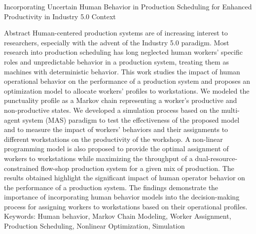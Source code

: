 Incorporating Uncertain Human Behavior in Production
Scheduling for Enhanced Productivity in Industry 5.0 Context
 
Abstract
Human-centered production systems are of increasing interest to researchers, especially with the advent of the Industry 5.0 paradigm. Most research into production scheduling has long neglected human workers’ specific roles and unpredictable behavior in a production system, treating them as machines with deterministic behavior. This work studies the impact of human operational behavior on the performance of a production system and proposes an optimization model to allocate workers’ profiles to workstations. We modeled the punctuality profile as a Markov chain representing a worker’s productive and non-productive states. We developed a simulation process based on the multi-agent system (MAS) paradigm to test the effectiveness of the proposed model and to measure the impact of workers’ behaviors and their assignments to different workstations on the productivity of the workshop. A non-linear programming model is also proposed to provide the optimal assignment of workers to workstations while maximizing the throughput of a dual-resource-constrained flow-shop production system for a given mix of production. The results obtained highlight the significant impact of human operator behavior on the performance of a production system. The findings demonstrate the importance of incorporating human behavior models into the decision-making process for assigning workers to workstations based on their operational profiles.
Keywords: Human behavior, Markov Chain Modeling, Worker Assignment, Production
Scheduling, Nonlinear Optimization, Simulation
 
